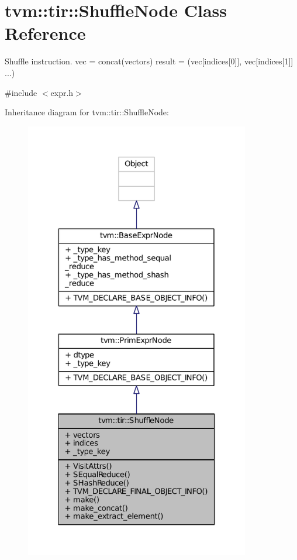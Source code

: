 \hypertarget{classtvm_1_1tir_1_1ShuffleNode}{}\section{tvm\+:\+:tir\+:\+:Shuffle\+Node Class Reference}
\label{classtvm_1_1tir_1_1ShuffleNode}


Shuffle instruction. vec = concat(vectors) result = (vec\mbox{[}indices\mbox{[}0\mbox{]}\mbox{]}, vec\mbox{[}indices\mbox{[}1\mbox{]}\mbox{]} ...)  




{\ttfamily \#include $<$expr.\+h$>$}



Inheritance diagram for tvm\+:\+:tir\+:\+:Shuffle\+Node\+:
\nopagebreak
\begin{figure}[H]
\begin{center}
\leavevmode
\includegraphics[height=550pt]{classtvm_1_1tir_1_1ShuffleNode__inherit__graph}
\end{center}
\end{figure}


